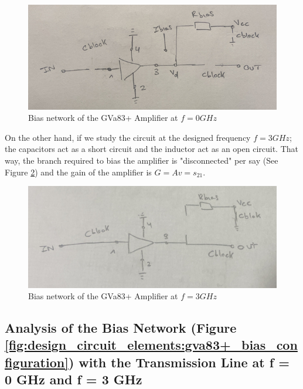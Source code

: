 \documentclass[12pt]{report} %
\begin{document}
\begin{figure}[htbp]
    \centering
    \includegraphics[width=\textwidth]{images/design_circuit_elements/gva83+_bias_f_0_ghz.png}
    \caption{Bias network of the GVa83+ Amplifier at $f = 0 GHz$}
    \label{fig:design_circuit_elements:gva83+_bias_f_0_ghz}
\end{figure}

On the other hand, if we study the circuit at the designed frequency $f = 3 GHz$; the capacitors act as a short circuit and the inductor act as an open circuit. That way, the branch required to bias the amplifier is "disconnected" per say (See Figure \ref{fig:design_circuit_elements:gva83+_bias_f_3_ghz}) and the gain of the amplifier is $G = Av = s_{21}$.

\begin{figure}[htbp]
    \centering
    \includegraphics[width=\textwidth]{images/design_circuit_elements/gva83+_bias_f_3_ghz.png}
    \caption{Bias network of the GVa83+ Amplifier at $f = 3 GHz$}
    \label{fig:design_circuit_elements:gva83+_bias_f_3_ghz}
\end{figure}

\subsection{Analysis of the Bias Network (Figure \ref{fig:design_circuit_elements:gva83+_bias_configuration}) with the Transmission Line at f = 0 GHz and f = 3 GHz}
\end{document}
